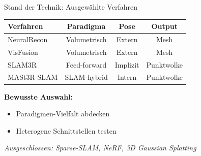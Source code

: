 \begin{frame}{Stand der Technik: Ausgewählte Verfahren}{\cite{sun2021neuralreconrealtimecoherent3d, gao2023visfusionvisibilityawareonline3d, murai2025mast3rslamrealtimedenseslam, liu2025slam3rrealtimedensescene}}
    \vspace{0.3cm}
    
    \begin{table}
        \Large
        \centering
        \renewcommand{\arraystretch}{1}
        \begin{tabular}{|l|c|c|c|}
            \hline
            \textbf{Verfahren} & \textbf{Paradigma} & \textbf{Pose} & \textbf{Output} \\
            \hline
            NeuralRecon & Volumetrisch & Extern & Mesh \\
            VisFusion & Volumetrisch & Extern & Mesh \\
            SLAM3R & Feed-forward & Implizit & Punktwolke \\
            MASt3R-SLAM & SLAM-hybrid & Intern & Punktwolke \\
            \hline
        \end{tabular}
    \end{table}
    
    \vspace{0.4cm}
    \textbf{Bewusste Auswahl:}
    \begin{itemize}
        \item Paradigmen-Vielfalt abdecken
        \item Heterogene Schnittstellen testen
    \end{itemize}
    
    \vspace{0.3cm}
    \textit{\small Ausgeschlossen: Sparse-SLAM, NeRF, 3D Gaussian Splatting}
\end{frame}